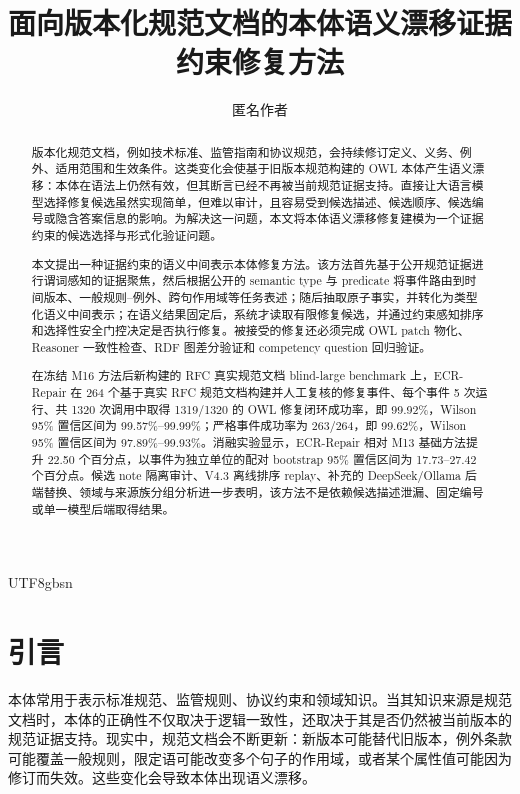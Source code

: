 \documentclass[11pt]{article}
\title{面向版本化规范文档的本体语义漂移证据约束修复方法}
\author{匿名作者}
\date{}
\begin{document}
\begin{CJK*}{UTF8}{gbsn}
\maketitle

\begin{abstract}
版本化规范文档，例如技术标准、监管指南和协议规范，会持续修订定义、义务、例外、适用范围和生效条件。这类变化会使基于旧版本规范构建的 OWL 本体产生语义漂移：本体在语法上仍然有效，但其断言已经不再被当前规范证据支持。直接让大语言模型选择修复候选虽然实现简单，但难以审计，且容易受到候选描述、候选顺序、候选编号或隐含答案信息的影响。为解决这一问题，本文将本体语义漂移修复建模为一个证据约束的候选选择与形式化验证问题。

本文提出一种证据约束的语义中间表示本体修复方法。该方法首先基于公开规范证据进行谓词感知的证据聚焦，然后根据公开的 semantic type 与 predicate 将事件路由到时间版本、一般规则--例外、跨句作用域等任务表述；随后抽取原子事实，并转化为类型化语义中间表示；在语义结果固定后，系统才读取有限修复候选，并通过约束感知排序和选择性安全门控决定是否执行修复。被接受的修复还必须完成 OWL patch 物化、Reasoner 一致性检查、RDF 图差分验证和 competency question 回归验证。

在冻结 M16 方法后新构建的 RFC 真实规范文档 blind-large benchmark 上，ECR-Repair 在 264 个基于真实 RFC 规范文档构建并人工复核的修复事件、每个事件 5 次运行、共 1320 次调用中取得 1319/1320 的 OWL 修复闭环成功率，即 99.92\%，Wilson 95\% 置信区间为 99.57\%--99.99\%；严格事件成功率为 263/264，即 99.62\%，Wilson 95\% 置信区间为 97.89\%--99.93\%。消融实验显示，ECR-Repair 相对 M13 基础方法提升 22.50 个百分点，以事件为独立单位的配对 bootstrap 95\% 置信区间为 17.73--27.42 个百分点。候选 note 隔离审计、V4.3 离线排序 replay、补充的 DeepSeek/Ollama 后端替换、领域与来源族分组分析进一步表明，该方法不是依赖候选描述泄漏、固定编号或单一模型后端取得结果。
\end{abstract}

\section{引言}

本体常用于表示标准规范、监管规则、协议约束和领域知识。当其知识来源是规范文档时，本体的正确性不仅取决于逻辑一致性，还取决于其是否仍然被当前版本的规范证据支持。现实中，规范文档会不断更新：新版本可能替代旧版本，例外条款可能覆盖一般规则，限定语可能改变多个句子的作用域，或者某个属性值可能因为修订而失效。这些变化会导致本体出现语义漂移。


\end{CJK*}
\end{document}

